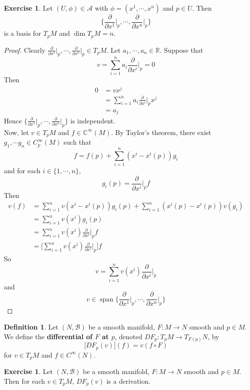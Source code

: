 \documentclass{book}
\theoremstyle{definition}
\newtheorem{defn}[definition]{Definition}
\newtheorem{ex}[definition]{Exercise}
\newcommand{\C}{\mathbb{C}}
\newcommand{\R}{\mathbb{R}}
\newcommand{\MA}{\mathcal{A}}
\newcommand{\MB}{\mathcal{B}}
\DeclareMathOperator{\spn}{span}
\DeclareMathOperator*{\0}{\mbf{0}}
\DeclareMathOperator*{\1}{\mbf{1}}
\newcommand{\tbf}[1]{\textbf{#1}}
\newcommand{\p}{\partial}
\begin{document}
	\begin{ex}
		Let $(U, \phi) \in \MA$ with $\phi = (x^1, \cdots, x^n)$ and $p \in U$. Then $$ \bigg \{\frac{\p}{\p x^1} \bigg|_p, \cdots, \frac{\p}{\p x^n} \bigg|_p \bigg \}$$ is a basis for $T_pM$ and $\dim T_pM = n$.
	\end{ex}

	\begin{proof}
		Clearly $\frac{\p}{\p x^1} \bigg|_p, \cdots, \frac{\p}{\p x^n} \bigg|_p \in T_pM$. Let $a_1, \cdots, a_n \in \R$. Suppose that $$v = \sum_{i=1}^n a_i \frac{\p}{\p x^i} \bigg |_p  = 0$$
		Then 
		\begin{align*}
			0
			&= v x^j \\
			&= \sum_{i=1}^n a_i \frac{\p}{\p x^i} \bigg |_p  x^j \\
			&= a_j
		\end{align*}
		Hence $\bigg \{\frac{\p}{\p x^1} \bigg|_p, \cdots, \frac{\p}{\p x^n} \bigg|_p \bigg \}$ is independent.\\
		Now, let $v \in T_pM$ and $f \in \C^{\infty}(M)$. By Taylor's theorem, there exist $g_1, \cdots g_n \in C_p^{\infty}(M)$ such that $$f = f(p) + \sum_{i=1}^n(x^i - x^i(p)) g_i$$ and for each $i \in \{1, \cdots, n\}$, $$g_i(p) = \frac{\p}{\p x^i} \bigg |_p  f $$ Then 
		\begin{align*}
			v(f)
			&= \sum_{i=1}^nv(x^i - x^i(p)) g_i(p) + \sum_{i=1}^n(x^i(p) - x^i(p)) v(g_i) \\
			&= \sum_{i=1}^nv(x^i)g_i(p) \\
			&= \sum_{i=1}^nv(x^i)\frac{\p}{\p x^i} \bigg |_p  f \\
			&= \bigg[ \sum_{i=1}^nv(x^i)\frac{\p}{\p x^i} \bigg |_p  \bigg] f
		\end{align*}
		So $$v = \sum_{i=1}^nv(x^i)\frac{\p}{\p x^i} \bigg |_p  $$ and $$v \in \spn \bigg \{\frac{\p}{\p x^1} \bigg|_p, \cdots, \frac{\p}{\p x^n} \bigg|_p \bigg \}$$
	\end{proof}



	\begin{defn}
		Let $(N, \MB)$ be a smooth manifold, $F: M \rightarrow N$ smooth and $p \in M$. We define the \tbf{differential of $F$ at $p$}, denoted $DF_p: T_pM \rightarrow T_{F(p)}N$, by $$\bigg[ DF_p(v) \bigg] (f) = v (f \circ F)$$  for $v \in T_pM$ and $f \in C^{\infty}(N)$.
	\end{defn}
	
	
	
	\begin{ex}
	Let $(N, \MB)$ be a smooth manifold, $F: M \rightarrow N$ smooth and $p \in M$. Then for each $v \in T_pM$, $DF_p(v)$ is a derivation.
	\end{ex}
	
\end{document}
